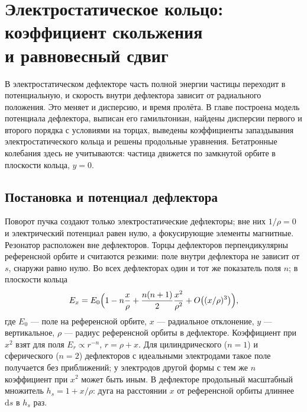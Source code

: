 \section[Электростатическое кольцо: коэффициент скольжения и равновесный сдвиг]{Электростатическое кольцо:\\ коэффициент скольжения\\ и равновесный сдвиг}
\label{sec:es-base}

В электростатическом дефлекторе часть полной энергии частицы переходит в потенциальную, и скорость внутри дефлектора зависит от радиального положения. Это меняет и дисперсию, и время пролёта. В главе построена модель потенциала дефлектора, выписан его гамильтониан, найдены дисперсии первого и второго порядка с условиями на торцах, выведены коэффициенты запаздывания электростатического кольца и решены продольные уравнения. Бетатронные колебания здесь не учитываются: частица движется по замкнутой орбите в плоскости кольца, $y=0$.

\subsection{Постановка и потенциал дефлектора}

Поворот пучка создают только электростатические дефлекторы; вне них $1/\rho=0$ и электрический потенциал равен нулю, а фокусирующие элементы магнитные. Резонатор расположен вне дефлекторов. Торцы дефлекторов перпендикулярны референсной орбите и считаются резкими: поле внутри дефлектора не зависит от $s$, снаружи равно нулю. Во всех дефлекторах один и тот же показатель поля $n$; в плоскости кольца
\begin{equation}
\label{eq:Ex}
E_x=E_0\Bigl(1-n\frac{x}{\rho}+\frac{n(n+1)}{2}\frac{x^2}{\rho^2}+O\bigl((x/\rho)^3\bigr)\Bigr),
\end{equation}
где $E_0$ --- поле на референсной орбите, $x$ --- радиальное отклонение, $y$ --- вертикальное, $\rho$ --- радиус референсной орбиты в дефлекторе. Коэффициент при $x^2$ взят для поля $E_r\propto r^{-n}$, $r=\rho+x$. Для цилиндрического ($n=1$) и сферического ($n=2$) дефлекторов с идеальными электродами такое поле получается без приближений; у электродов другой формы с тем же $n$ коэффициент при $x^2$ может быть иным. В дефлекторе продольный масштабный множитель $h_s=1+x/\rho$: дуга на расстоянии $x$ от референсной орбиты длиннее $\mathrm{d}s$ в $h_s$ раз.

